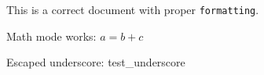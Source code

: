 \documentclass{article}
\begin{document}
This is a correct document with proper \texttt{formatting}.

Math mode works: $a = b + c$

Escaped underscore: test\_underscore
\end{document}
